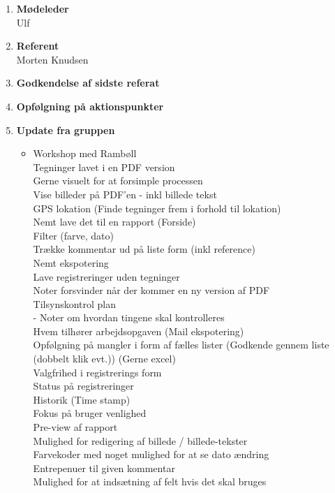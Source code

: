 	\begin{enumerate}
		\itemsep 0.3em 
		\item \textbf{Mødeleder}\\
			Ulf
		\item \textbf{Referent}\\
			Morten Knudsen
		\item \textbf{Godkendelse af sidste referat}
			
		\item\textbf{ Opfølgning på aktionspunkter}

		\item \textbf{Update fra gruppen}
			\begin{itemize}[-]
			\item Workshop med Rambøll\\
				Tegninger lavet i en PDF version \\
				Gerne visuelt for at forsimple processen \\
				Vise billeder på PDF'en - inkl billede tekst \\
				GPS lokation (Finde tegninger frem i forhold til lokation) \\
				Nemt lave det til en rapport (Forside) \\
				Filter (farve, dato) \\
				Trække kommentar ud på liste form (inkl reference) \\
				Nemt ekspotering \\
				Lave registreringer uden tegninger \\
				Noter forsvinder når der kommer en ny version af PDF \\
				Tilsynskontrol plan \\
				- Noter om hvordan tingene skal kontrolleres \\
				Hvem tilhører arbejdsopgaven (Mail ekspotering) \\
				Opfølgning på mangler i form af fælles lister (Godkende gennem liste (dobbelt klik evt.)) (Gerne excel) \\
				Valgfrihed i registrerings form \\
				Status på registreringer \\
				Historik (Time stamp) \\
				Fokus på bruger venlighed \\
				Pre-view af rapport \\
				Mulighed for redigering af billede / billede-tekster \\ 
				Farvekoder med noget mulighed for at se dato ændring\\
				Entrepenuer til given kommentar \\
				Mulighed for at indsætning af felt hvis det skal bruges \\
				

\end{itemize}
\end{enumerate}

